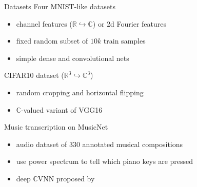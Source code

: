 \documentclass{beamer}
\newcommand{\real}{\mathbb{R}}
\newcommand{\cplx}{\mathbb{C}}
\begin{document}
\begin{frame}[t]{\insertsection}{Datasets}
  Four MNIST-like datasets
  \begin{itemize}
    \item channel features ($\real \hookrightarrow \cplx$) or $2$d Fourier features
    \item fixed random subset of $10k$ train samples
    \item simple dense and convolutional nets
  \end{itemize}

  \pause
  \medskip
  CIFAR10 dataset ($\real^3 \hookrightarrow \cplx^3$)
  \begin{itemize}
    \item random cropping and horizontal flipping
    \item $\cplx$-valued variant of VGG16 {\tiny \citep{simonyan_very_2015}}
  \end{itemize}

  \pause
  \medskip
  Music transcription on MusicNet {\tiny \citep{thickstun_learning_2017}}
  \begin{itemize}
    \item audio dataset of $330$ annotated musical compositions
    \item use power spectrum to tell which piano keys are pressed
    \item deep $\cplx$VNN proposed by \citep{trabelsi_deep_2018}
  \end{itemize}

\end{frame}
\end{document}
